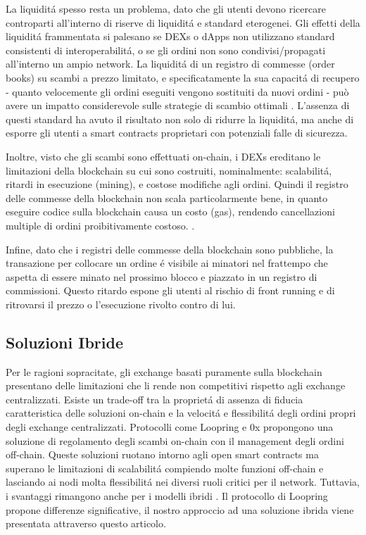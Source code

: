 \documentclass[UTF8,nofonts]{article}
\begin{document}
\begin{multicols}{2}
La liquidit\'a spesso resta un problema, dato che gli utenti devono ricercare controparti all'interno di riserve di liquidit\'a e standard eterogenei. Gli effetti della liquidit\'a frammentata si palesano se DEXs o dApps non utilizzano standard consistenti di interoperabilit\'a, o se gli ordini non sono condivisi/propagati all'interno un ampio network. La liquidit\'a di un registro di commesse (order books) su scambi a prezzo limitato, e specificatamente la sua capacit\'a di  recupero - quanto velocemente gli ordini eseguiti vengono sostituiti da nuovi ordini - può avere un impatto considerevole sulle strategie di scambio ottimali \cite{limitorderliquidity}. L'assenza di questi standard ha avuto il risultato non solo di ridurre la liquidit\'a, ma anche di esporre gli utenti a smart contracts proprietari con potenziali falle di sicurezza.

Inoltre, visto che gli scambi sono effettuati on-chain, i DEXs ereditano le limitazioni della blockchain su cui sono costruiti, nominalmente: scalabilit\'a, ritardi in esecuzione (mining), e costose modifiche agli ordini. Quindi il registro delle commesse della blockchain non scala particolarmente bene, in quanto eseguire codice sulla blockchain causa un costo (gas), rendendo cancellazioni multiple di ordini proibitivamente costoso. .

Infine, dato che i registri delle commesse della blockchain sono pubbliche, la transazione per collocare un ordine \'e visibile ai minatori nel frattempo che aspetta di essere minato nel prossimo blocco e piazzato in un registro di commissioni. Questo ritardo espone gli utenti al rischio di front running e di ritrovarsi il prezzo o l'esecuzione rivolto contro di lui.

\subsection{Soluzioni Ibride}
Per le ragioni sopracitate, gli exchange basati puramente sulla blockchain presentano delle limitazioni che li rende non competitivi rispetto agli exchange centralizzati.  Esiste un trade-off tra la propriet\'a di assenza di fiducia caratteristica delle soluzioni on-chain  e la velocit\'a e flessibilit\'a degli ordini propri degli exchange centralizzati. Protocolli come Loopring e 0x  \cite{warren20170x} propongono una soluzione di regolamento degli scambi  on-chain con il management degli ordini off-chain. Queste soluzioni ruotano intorno agli open smart contracts ma superano le limitazioni di scalabilit\'a compiendo molte funzioni off-chain e lasciando ai nodi molta flessibilit\'a nei diversi ruoli critici per il network. Tuttavia, i svantaggi rimangono anche per i modelli ibridi \cite{costofdecent}. Il protocollo di Loopring propone differenze significative, il nostro approccio ad una soluzione ibrida viene presentata attraverso questo articolo.




\end{multicols}
\end{document}
